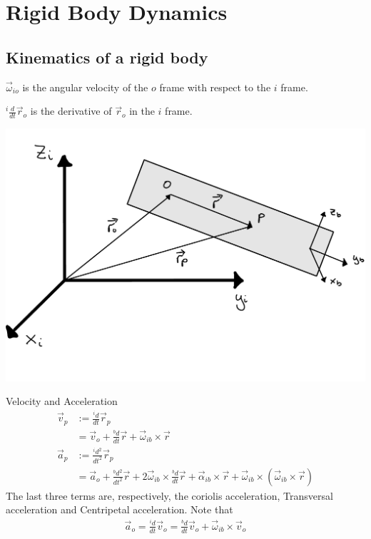 \setcounter{section}{2}
\section{Rigid Body Dynamics}
\setcounter{section}{6}
\setcounter{subsection}{11}
\subsection{Kinematics of a rigid body} %
\(\vec{\omega}_{io}\) is the angular velocity of the \(o\) frame with respect to the \(i\) frame.

\({}^i\frac{d}{dt}\vec{r}_o\) is the derivative of \(\vec{r}_o\) in the \(i\) frame.

\begin{Figure}
    \includegraphics[clip, trim = 0cm 2cm 0cm 0cm,width=\linewidth]{figures/rigid-body.pdf}
    \label{fig:rigid-body}
\end{Figure}

Velocity and Acceleration
\begin{align*}
    \vec{v}_p &:= \frac{{}^id}{dt}\vec{r}_p \\
              &= \vec{v}_o + \frac{{}^bd}{dt}\vec{r} + \vec{\omega}_{ib}\times\vec{r} \\
    \vec{a}_p &:= \frac{{}^id^2}{dt^2}\vec{r}_p \\
              &= \vec{a}_o + \frac{{}^bd^2}{dt^2}\vec{r} + 2\vec{\omega}_{ib}\times\frac{{}^bd}{dt}\vec{r} + \vec{\alpha}_{ib}\times\vec{r} + \vec{\omega}_{ib}\times(\vec{\omega}_{ib}\times\vec{r})
\end{align*}
The last three terms are, respectively, the coriolis acceleration, Transversal acceleration and Centripetal acceleration. Note that
\begin{align*}
    \vec{a}_o = \frac{{}^id}{dt}\vec{v}_o = \frac{{}^bd}{dt}\vec{v}_o + \vec{\omega}_{ib}\times\vec{v}_o
\end{align*}



